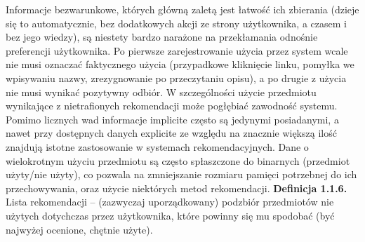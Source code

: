 \documentclass{pracamgr}
\begin{document}
    Informacje bezwarunkowe, których główną zaletą jest łatwość ich zbierania
    (dzieje się to automatycznie, bez dodatkowych akcji ze strony użytkownika, a czasem i bez jego wiedzy),
    są niestety bardzo narażone na przekłamania odnośnie preferencji użytkownika.
    Po pierwsze zarejestrowanie użycia przez system wcale nie musi oznaczać faktycznego użycia
    (przypadkowe kliknięcie linku, pomyłka we wpisywaniu nazwy, zrezygnowanie po przeczytaniu opisu), 
    a po drugie z użycia nie musi wynikać pozytywny odbiór.
    W szczególności użycie przedmiotu wynikające z nietrafionych rekomendacji może pogłębiać zawodność systemu.\newline
    Pomimo licznych wad informacje implicite często są jedynymi posiadanymi, a nawet przy dostępnych danych explicite ze względu na
    znacznie większą ilość znajdują istotne zastosowanie w systemach rekomendacyjnych.
    Dane o wielokrotnym użyciu przedmiotu są często spłaszczone do binarnych (przedmiot użyty/nie użyty),
    co pozwala na zmniejszanie rozmiaru pamięci potrzebnej do ich przechowywania, oraz użycie niektórych metod rekomendacji.\newline\newline
   \textbf{Definicja 1.1.6.} Lista rekomendacji -- (zazwyczaj uporządkowany) podzbiór przedmiotów nie użytych dotychczas przez użytkownika,
    które powinny się mu spodobać (być najwyżej ocenione, chętnie użyte).
    
\end{document}
